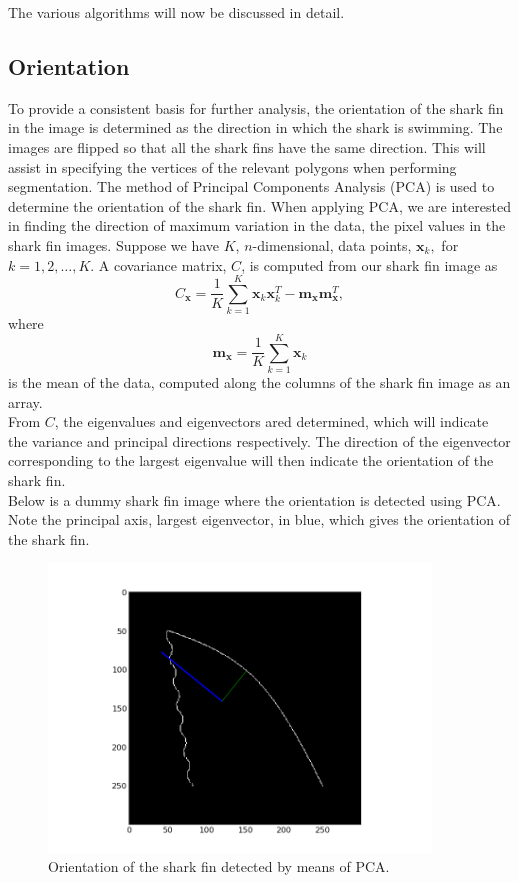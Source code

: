 \documentclass[a4paper,10pt]{article}
\begin{document}
The various algorithms will now be discussed in detail.  

\subsection{Orientation}
\label{orient}
To provide a consistent basis for further analysis, the
orientation of the shark fin in the image is determined as the direction in
which the shark is
swimming.  The images are flipped so that
all the shark fins have the same direction.  This will assist in specifying the vertices of the relevant polygons when performing
segmentation.
The method of Principal Components Analysis (PCA) is used to determine the orientation of the shark fin.  When applying
PCA, we are interested in finding the direction of maximum variation in the
data, the pixel values in the shark fin images.  Suppose we have $K$, $n$-dimensional, data points, $\mathbf{x}_k,$ for
$k=1,2, \ldots ,K$.  A covariance matrix, $C$, is computed from our shark fin image as 
\[
 C_{\mathbf{x}} = \frac{1}{K} \sum_{k=1}^{K} \mathbf{x}_{k}\mathbf{x}_{k}^{T} -
\mathbf{m}_{\mathbf{x}}\mathbf{m}_{\mathbf{x}}^{T} 
,\]
where
\[
 \mathbf{m}_{\mathbf{x}} = \frac{1}{K} \sum_{k=1}^{K}\mathbf{x}_{k}
\]
is the mean of the data, computed along the columns of the shark fin image as an array. \\


From $C$, the eigenvalues and eigenvectors ared determined, which will indicate the
variance and principal directions respectively.
The direction of the eigenvector corresponding to the largest eigenvalue will
then indicate the orientation of the shark fin. \\

Below is a dummy shark fin image where the orientation is detected using PCA.
Note the principal axis, largest eigenvector, in blue, which gives the
orientation of the shark fin.
\begin{figure}[H]
 \centering
 \includegraphics[width=4in]{orientation.jpg}
 \caption{Orientation of the shark fin detected by means of PCA.}
 \label{orientation}
\end{figure}
\end{document}
